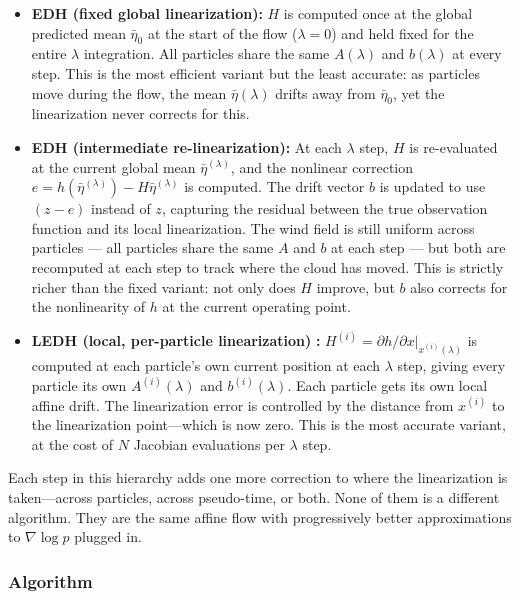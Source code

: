 \documentclass{article}
\begin{document}
\begin{itemize}
    \item \textbf{EDH (fixed global linearization):} $H$ is computed once at the global predicted mean $\bar{\eta}_0$ at the start of the flow ($\lambda = 0$) and held fixed for the entire $\lambda$ integration. All particles share the same $A(\lambda)$ and $b(\lambda)$ at every step. This is the most efficient variant but the least accurate: as particles move during the flow, the mean $\bar{\eta}(\lambda)$ drifts away from $\bar{\eta}_0$, yet the linearization never corrects for this.

    \item \textbf{EDH (intermediate re-linearization):} At each $\lambda$ step, $H$ is re-evaluated at the current global mean $\bar{\eta}^{(\lambda)}$, and the nonlinear correction $e = h(\bar{\eta}^{(\lambda)}) - H\bar{\eta}^{(\lambda)}$ is computed. The drift vector $b$ is updated to use $(z - e)$ instead of $z$, capturing the residual between the true observation function and its local linearization. The wind field is still uniform across particles — all particles share the same $A$ and $b$ at each step — but both are recomputed at each step to track where the cloud has moved. This is strictly richer than the fixed variant: not only does $H$ improve, but $b$ also corrects for the nonlinearity of $h$ at the current operating point.

    \item \textbf{LEDH (local, per-particle linearization)} \cite{Li-Particle-Filtering-2017}\textbf{:} $H^{(i)} = \partial h/\partial x\big|_{x^{(i)}(\lambda)}$ is computed at each particle's own current position at each $\lambda$ step, giving every particle its own $A^{(i)}(\lambda)$ and $b^{(i)}(\lambda)$. Each particle gets its own local affine drift. The linearization error is controlled by the distance from $x^{(i)}$ to the linearization point—which is now zero. This is the most accurate variant, at the cost of $N$ Jacobian evaluations per $\lambda$ step.
\end{itemize}

Each step in this hierarchy adds one more correction to where the linearization is taken—across particles, across pseudo-time, or both. None of them is a different algorithm. They are the same affine flow with progressively better approximations to $\nabla \log p$ plugged in.

\subsubsection{Algorithm}
\end{document}
